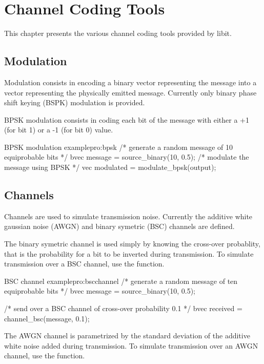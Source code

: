 \chapter{Channel Coding Tools}
\label{cha:channelcoding}

      This chapter presents the various channel coding tools provided by libit.

\section{Modulation}
\label{sec:modulation}

     Modulation consists in encoding a binary vector representing the
     message into a vector representing the physically emitted
     message. Currently only binary phase shift keying (BSPK)
     modulation is provided.

     BPSK modulation consists in coding each bit of the message with
     either a +1 (for bit 1) or a -1 (for bit 0) value.


  \begin{program}{BPSK modulation example}{pro:bpsk}
  /* generate a random message of 10 equiprobable bits */
  bvec message = source_binary(10, 0.5);
  /* modulate the message using BPSK */
  vec modulated = modulate_bpsk(output);
\end{program}


\section{Channels}
\label{sec:channels}

     Channels are used to simulate transmission noise. Currently the
  additive white gaussian noise (AWGN) and binary symetric (BSC)
  channels are defined.  

     The binary symetric channel is used simply by knowing the
  cross-over probablity, that is the probability for a bit to be
  inverted during transmission. To simulate transmission over a BSC
  channel, use the  function. 

  \begin{program}{BSC channel example}{pro:bscchannel}
  /* generate a random message of ten equiprobable bits */
  bvec message = source_binary(10, 0.5);

  /* send over a BSC channel of cross-over probability 0.1 */ 
  bvec received = channel_bsc(message, 0.1);
\end{program}

     The AWGN channel is parametrized by the standard deviation of the
  additive white noise added during transmission. To simulate
  transmission over an AWGN channel, use the 
   function. 

